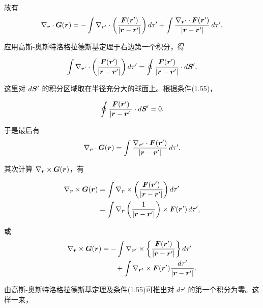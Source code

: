 故有
\begin{equation*}
\nabla_{\bm{r}} \cdot \bm{G}(\bm{r}) = -\int \nabla_{\bm{r}'} \cdot \left(\frac{\bm{F}(\bm{r}')}{|\bm{r} - \bm{r}'|}\right) d\tau' + \int \frac{\nabla_{\bm{r}'} \cdot \bm{F}(\bm{r}')}{|\bm{r} - \bm{r}'|}\, d\tau',
\end{equation*}

应用高斯-奥斯特洛格拉德斯基定理于右边第一个积分，得

\begin{equation*}
\int \nabla_{\bm{r}'} \cdot \left(\frac{\bm{F}(\bm{r}')}{|\bm{r} - \bm{r}'|}\right) d\tau' = \oint \frac{\bm{F}(\bm{r}')}{|\bm{r} - \bm{r}'|} \cdot d\bm{S}',
\end{equation*}

这里对 $d\bm{S}'$ 的积分区域取在半径充分大的球面上。根据条件(1.55)，

\begin{equation*}
\oint \frac{\bm{F}(\bm{r}')}{|\bm{r} - \bm{r}'|} \cdot d\bm{S}' = 0.
\end{equation*}

于是最后有
\begin{equation*}
\nabla_{\bm{r}} \cdot \bm{G}(\bm{r}) = \int \frac{\nabla_{\bm{r}'} \cdot \bm{F}(\bm{r}')}{|\bm{r} - \bm{r}'|}\, d\tau'.
\end{equation*}

其次计算 $\nabla_{\bm{r}} \times \bm{G}(\bm{r})$，有

\begin{equation*}
\begin{aligned}
\nabla_{\bm{r}} \times \bm{G}(\bm{r}) &= \int \nabla_{\bm{r}} \times \left(\frac{\bm{F}(\bm{r}')}{|\bm{r} - \bm{r}'|}\right) d\tau'\\
&= \int \nabla_{\bm{r}} \left(\frac{1}{|\bm{r} - \bm{r}'|}\right) \times \bm{F}(\bm{r}')\, d\tau',
\end{aligned}
\end{equation*}

或
\begin{equation*}
\begin{aligned}
\nabla_{\bm{r}} \times \bm{G}(\bm{r}) &= -\int \nabla_{\bm{r}'} \times \left\{\frac{\bm{F}(\bm{r}')}{|\bm{r} - \bm{r}'|}\right\} d\tau'\\
&\qquad + \int \nabla_{\bm{r}'} \times \bm{F}(\bm{r}') \frac{d\tau'}{|\bm{r} - \bm{r}'|}.
\end{aligned}
\end{equation*}

由高斯-奥斯特洛格拉德斯基定理及条件(1.55)可推出对 $d\tau'$ 的第一个积分为零。这样一来，

